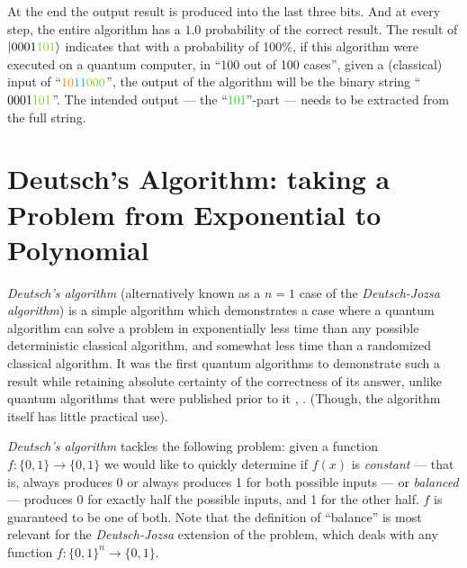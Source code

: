 \documentclass[conference]{IEEEtran}
\begin{document}
At the end the output result is produced into the last three bits.
And at every step, the entire algorithm has a $1.0$ probability of the correct result. %
The result of $\ket{0001\textcolor{LimeGreen}{101}}$ indicates that with a probability of 100\%,
if this algorithm were executed on a quantum computer, in ``100 out of 100 cases'', given a (classical) input of ``$\textcolor{orange}{10}\textcolor{cyan}{11}\textcolor{LimeGreen}{000}$'',
the output of the algorithm will be the binary string ``$0001\textcolor{LimeGreen}{101}$''.
The intended output — the ``\textcolor{LimeGreen}{101}''-part — needs to be extracted from the full string.


\section{Deutsch's Algorithm: taking a Problem from Exponential to Polynomial}
\label{sec:DeutschsAlgorithm}

\textit{Deutsch's algorithm} (alternatively known as a $n=1$ case of the \textit{Deutsch-Jozsa algorithm})
is a simple algorithm which
demonstrates a case where a quantum algorithm can solve a problem in exponentially less time than any
possible deterministic classical algorithm,
and somewhat less time than a randomized classical algorithm.
It was the first quantum algorithms to demonstrate such a result while retaining absolute
certainty of the correctness of its answer, unlike quantum algorithms that were published prior to it \cite{ref:deutschjozsaAlgorithm}, \cite{ref:wikipediaDeutschJozsaAlgorithm}.
(Though, the algorithm itself has little practical use).

\textit{Deutsch's algorithm} tackles the following problem: given a function $f: \{0, 1\} \rightarrow \{0, 1\}$
we would like to quickly determine if $f(x)$ is \textit{constant} — that is, always produces 0 or always produces 1 for both possible inputs —
or \textit{balanced} — produces 0 for exactly half the possible inputs, and 1 for the other half. $f$ is guaranteed to be one of both.
Note that the definition of ``balance'' is most relevant for the \textit{Deutsch-Jozsa} extension of the problem,
which deals with any function $f: \{0, 1\}^n \rightarrow \{0, 1\}$.
\end{document}
